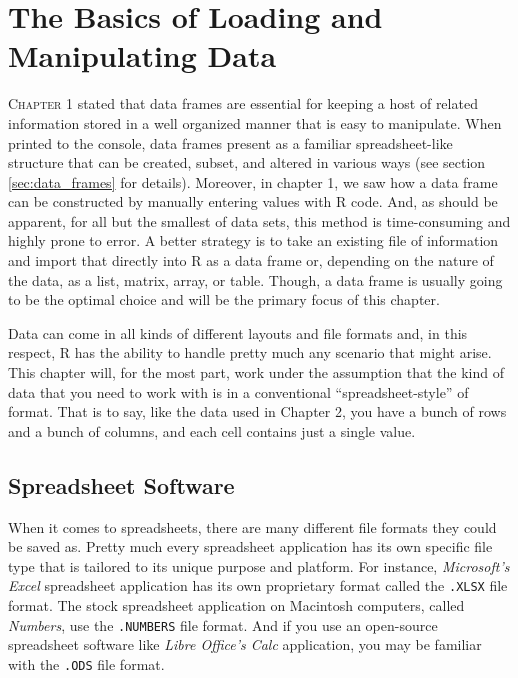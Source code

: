 \chapter{The Basics of Loading and Manipulating Data}

\lettrine{C}{hapter} 1 stated that data frames are essential for keeping a host of related information stored in a well organized manner that is easy to manipulate. When printed to the console, data frames present as a familiar spreadsheet-like structure that can be created, subset, and altered in various ways (see section \ref{sec:data_frames} for details). Moreover, in chapter 1, we saw how a data frame can be constructed by manually entering values with R code. And, as should be apparent, for all but the smallest of data sets, this method is time-consuming and highly prone to error. A better strategy is to take an existing file of information and import that directly into R as a data frame or, depending on the nature of the data, as a list, matrix, array, or table. Though, a data frame is usually going to be the optimal choice and will be the primary focus of this chapter.

Data can come in all kinds of different layouts and file formats and, in this respect, R has the ability to handle pretty much any scenario that might arise. This chapter will, for the most part, work under the assumption that the  kind of data that you need to work with is in a conventional ``spreadsheet-style'' of format. That is to say, like the  data used in Chapter 2, you have a bunch of rows and a bunch of columns, and each cell contains just a single value.

\section{Spreadsheet Software}
\label{sec:spreadsheet_soft}

When it comes to spreadsheets, there are many different file formats they could be saved as.  Pretty much every spreadsheet application has its own specific file type that is tailored to its unique purpose and platform. For instance, \textit{Microsoft's Excel} spreadsheet application has its own proprietary format called the \texttt{.XLSX} file format. The stock spreadsheet application on Macintosh computers, called \textit{Numbers}, use the \texttt{.NUMBERS} file format. And if you use an open-source spreadsheet software like \textit{Libre Office's Calc} application, you may be familiar with the \texttt{.ODS} file format.


